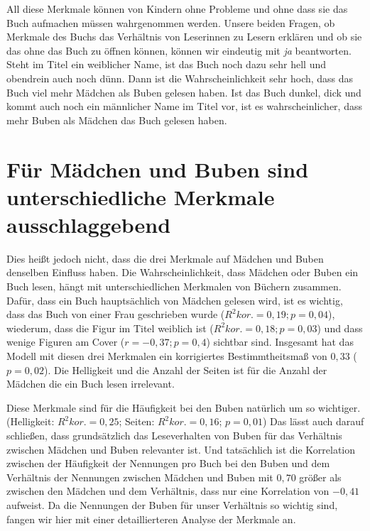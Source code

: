 All diese Merkmale können von Kindern ohne Probleme und ohne dass sie
das Buch aufmachen müssen wahrgenommen werden. Unsere beiden Fragen, ob
Merkmale des Buchs das Verhältnis von Leserinnen zu Lesern erklären und
ob sie das ohne das Buch zu öffnen können, können wir eindeutig mit
\emph{ja} beantworten. Steht im Titel ein weiblicher Name, ist das Buch
noch dazu sehr hell und obendrein auch noch dünn. Dann ist die
Wahrscheinlichkeit sehr hoch, dass das Buch viel mehr Mädchen als Buben
gelesen haben. Ist das Buch dunkel, dick und kommt auch noch ein
männlicher Name im Titel vor, ist es wahrscheinlicher, dass mehr Buben
als Mädchen das Buch gelesen haben.



\section{Für Mädchen und Buben sind unterschiedliche Merkmale
ausschlaggebend}

Dies heißt jedoch nicht, dass die drei Merkmale auf Mädchen und Buben
denselben Einfluss haben. Die Wahrscheinlichkeit, dass Mädchen oder
Buben ein Buch lesen, hängt mit unterschiedlichen Merkmalen von Büchern
zusammen. Dafür, dass ein Buch hauptsächlich von Mädchen gelesen wird,
ist es wichtig, dass das Buch von einer Frau geschrieben wurde
($R^2 \scriptstyle kor.\textstyle =0{,}19; p=0{,}04$), wiederum, dass
die Figur im Titel weiblich ist
($R^{2}\scriptstyle kor.\textstyle =0{,}18; p=0{,}03$) und dass wenige
Figuren am Cover ($r=-0{,}37; p=0{,}4$) sichtbar sind. Insgesamt hat das
Modell mit diesen drei Merkmalen ein korrigiertes Bestimmtheitsmaß von
$0{,}33$ ($p=0{,}02$). Die Helligkeit und die Anzahl der Seiten ist für
die Anzahl der Mädchen die ein Buch lesen irrelevant.

Diese Merkmale sind für die Häufigkeit bei den Buben natürlich um so
wichtiger. (Helligkeit: $R^2 \scriptstyle kor.\textstyle =0{,}25$;
Seiten: $R^2 \scriptstyle kor.\textstyle =0{,}16$; $p=0{,}01$) Das lässt
auch darauf schließen, dass grundsätzlich das Leseverhalten von Buben
für das Verhältnis zwischen Mädchen und Buben relevanter ist. Und
tatsächlich ist die Korrelation zwischen der Häufigkeit der Nennungen
pro Buch bei den Buben und dem Verhältnis der Nennungen zwischen Mädchen
und Buben mit $0{,}70$ größer als zwischen den Mädchen und dem
Verhältnis, dass nur eine Korrelation von $-0{,}41$ aufweist. Da die
Nennungen der Buben für unser Verhältnis so wichtig sind, fangen wir
hier mit einer detaillierteren Analyse der Merkmale an.

